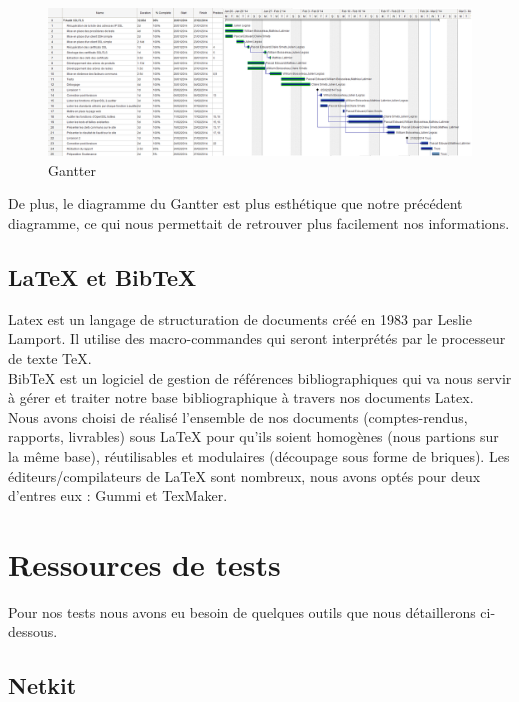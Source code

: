 \begin{figure}[H]
\begin{center}
\includegraphics[scale=0.28]{images/projet_gantter.png}
\end{center}
\caption{Gantter}
\label{gantter}
\end{figure}

De plus, le diagramme du Gantter est plus esthétique que notre précédent diagramme, ce qui nous permettait de retrouver plus facilement nos informations.

\subsection{LaTeX et BibTeX}

Latex est un langage de structuration de documents créé en 1983 par Leslie Lamport. Il utilise des macro-commandes qui seront interprétés par le processeur de texte TeX.\\
BibTeX est un logiciel de gestion de références bibliographiques qui va nous servir à gérer et traiter notre base bibliographique à travers nos documents Latex.\\

Nous avons choisi de réalisé l'ensemble de nos documents (comptes-rendus, rapports, livrables) sous LaTeX pour qu'ils soient homogènes (nous partions sur la même base), réutilisables et modulaires (découpage sous forme de briques). Les éditeurs/compilateurs de LaTeX sont nombreux, nous avons optés pour deux d'entres eux : Gummi et TexMaker.

\section{Ressources de tests}

Pour nos tests nous avons eu besoin de quelques outils que nous détaillerons ci-dessous.

\subsection{Netkit}

